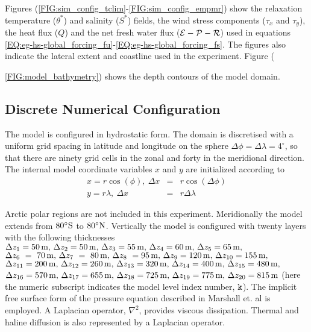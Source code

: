 Figures (\ref{FIG:sim_config_tclim}-\ref{FIG:sim_config_empmr}) show the
relaxation temperature ($\theta^{\ast}$) and salinity ($S^{\ast}$) fields,
the wind stress components ($\tau_x$ and $\tau_y$), the heat flux ($Q$)
and the net fresh water flux (${\cal E} - {\cal P} - {\cal R}$) used
in equations \ref{EQ:eg-hs-global_forcing_fu}-\ref{EQ:eg-hs-global_forcing_fs}. The figures
also indicate the lateral extent and coastline used in the experiment.
Figure ({\ref{FIG:model_bathymetry}) shows the depth contours of the model
domain.


\subsection{Discrete Numerical Configuration}


 The model is configured in hydrostatic form.  The domain is discretised with 
a uniform grid spacing in latitude and longitude on the sphere
 $\Delta \phi=\Delta \lambda=4^{\circ}$, so 
that there are ninety grid cells in the zonal and forty in the 
meridional direction. The internal model coordinate variables
$x$ and $y$ are initialized according to
\begin{eqnarray}
x=r\cos(\phi),~\Delta x & = &r\cos(\Delta \phi) \\
y=r\lambda,~\Delta x &= &r\Delta \lambda 
\end{eqnarray}

Arctic polar regions are not
included in this experiment. Meridionally the model extends from
$80^{\circ}{\rm S}$ to $80^{\circ}{\rm N}$.
Vertically the model is configured with twenty layers with the 
following thicknesses
$\Delta z_{1} = 50\,{\rm m},\,
 \Delta z_{2} = 50\,{\rm m},\,
 \Delta z_{3} = 55\,{\rm m},\,
 \Delta z_{4} = 60\,{\rm m},\,
 \Delta z_{5} = 65\,{\rm m},\,
$
$
 \Delta z_{6}~=~70\,{\rm m},\,
 \Delta z_{7}~=~80\,{\rm m},\,
 \Delta z_{8}~=95\,{\rm m},\,
 \Delta z_{9}=120\,{\rm m},\,
 \Delta z_{10}=155\,{\rm m},\,
$
$
 \Delta z_{11}=200\,{\rm m},\,
 \Delta z_{12}=260\,{\rm m},\,
 \Delta z_{13}=320\,{\rm m},\,
 \Delta z_{14}=400\,{\rm m},\,
 \Delta z_{15}=480\,{\rm m},\,
$
$
 \Delta z_{16}=570\,{\rm m},\,
 \Delta z_{17}=655\,{\rm m},\,
 \Delta z_{18}=725\,{\rm m},\,
 \Delta z_{19}=775\,{\rm m},\,
 \Delta z_{20}=815\,{\rm m}
$ (here the numeric subscript indicates the model level index number, ${\tt k}$).
The implicit free surface form of the pressure equation described in Marshall et. al 
\cite{marshall:97a} is employed. A Laplacian operator, $\nabla^2$, provides viscous
dissipation. Thermal and haline diffusion is also represented by a Laplacian operator.

}
